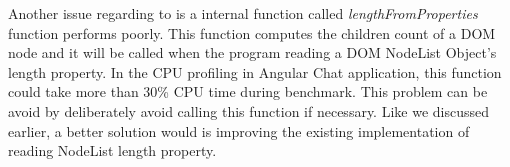 Another issue regarding to \jsdom{} is a internal function called \emph{lengthFromProperties} function 
performs poorly.
This function computes the children count of a DOM node and it will be called 
when the program reading a DOM NodeList Object's length property.
In the CPU profiling in Angular Chat application, 
this function could take more than 30\% CPU time during benchmark.%
This problem can be avoid by deliberately avoid calling this function if necessary.
Like we discussed earlier, a better solution would is improving the existing implementation
of reading NodeList length property.

